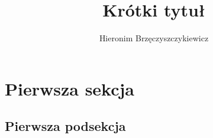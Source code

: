 \documentclass[12pt]{article} %
\title{Krótki tytuł}
\author{Hieronim Brzęczyszczykiewicz}
\begin{document}
\maketitle %

\section{Pierwsza sekcja}

\subsection{Pierwsza podsekcja}
\end{document}
